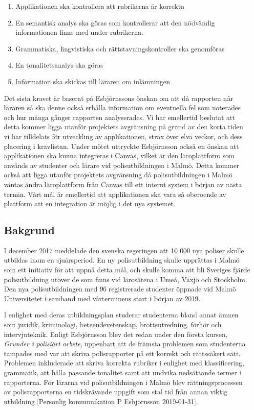 \documentclass[swedish]{maucsthesis}
\begin{document}
\begin{enumerate}
\item Applikationen ska kontrollera att rubrikerna är korrekta
\item En semantisk analys ska göras som kontrollerar att den nödvändig
  informationen finns med under rubrikerna.
\item Grammatiska, lingvistiska och rättstavningskontroller ska genomföras
\item En tonalitetsanalys ska göras
\item Information ska skickas till läraren om inlämningen    
\end{enumerate}
Det sista kravet är baserat på Esbjörnssons önskan om att då rapporten når
läraren så ska denne också erhålla information om eventuella fel som noterades
och hur många gånger rapporten analyserades. Vi har emellertid beslutat att
detta kommer ligga utanför projektets avgränsning på grund av den korta tiden vi
har tilldelats för utveckling av applikationen, strax över elva veckor, och
dess placering i kravlistan. Under mötet uttryckte Esbjörnsson också en
önskan att applikationen ska kunna integreras i Canvas, vilket är den
läroplattform som används av studenter och lärare vid polisutbildningen i Malmö. Detta kommer också att ligga utanför projektets avgränsning då
polisutbildningen i Malmö väntas ändra läroplattform från Canvas till ett internt
system i början av nästa termin. Vårt mål är emellertid att applikationen ska
vara så oberoende av plattform att en integration är möjlig i det nya systemet.

\subsection{Bakgrund}
I december 2017 meddelade den svenska regeringen att 10 000 nya poliser skulle
utbildas inom en sjuårsperiod. En ny polisutbildning skulle upprättas i Malmö
som ett initiativ för att uppnå detta mål, och skulle komma att bli Sveriges
fjärde polisutbildning utöver de som finns vid lärosätena i Umeå, Växjö och
Stockholm. Den nya polisutbildningen med 96 registrerade studenter öppnade vid
Malmö Universitetet i samband med vårterminens start i början av 2019.

I enlighet med deras utbildningsplan studerar studenterna bland annat ämnen som
juridik, kriminologi, beteendevetenskap, brottsutredning, förhör och
intervjuteknik. Enligt Esbjörnsson blev det
redan under den första kursen, \textit {Grunder i polisiärt arbete}, uppenbart att de
främsta problemen som studenterna tampades med var att skriva polisrapporter på
ett korrekt och rättssäkert sätt. Problemen inkluderade att skriva korrekta
rubriker i enlighet med klassificering, grammatik, att hålla passande
tonalitet samt att undvika nedsättande termer i rapporterna. För lärarna vid
polisutbildningen i Malmö blev rättningsprocessen av polisrapporterna en
tidskrävande uppgift som stal tid från annan viktig utbildning [Personlig kommunikation P Esbjörnsson 2019-01-31].
\end{document}
